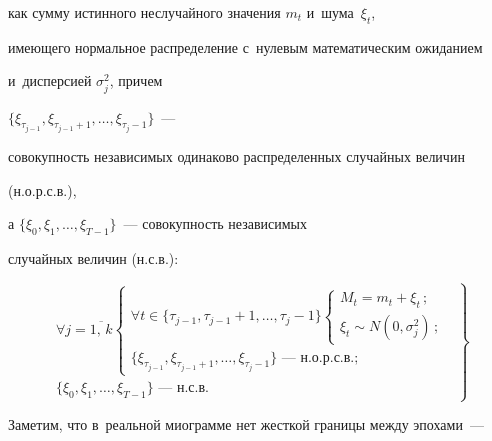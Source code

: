 как сумму истинного неслучайного значения $m_t$ и~шума~$\xi_t$,


имеющего нормальное распределение с~нулевым математическим ожиданием


и~дисперсией $\sigma^2_j$, причем


$\{\xi_{\tau_{j-1}} ,  \xi_{\tau_{j-1}+1} , \ldots,  \xi_{\tau_{j}-1}\}$~---


совокупность независимых одинаково распределенных случайных величин


(н.о.р.с.в.),


а $\{\xi_0 ,  \xi_1 , \ldots ,  \xi_{T-1}\}$~--- совокупность независимых


случайных величин (н.с.в.):


\begin{equation}


\left.


\begin{array}{l}


    \forall j=\overline{1,\, k}


    \begin{cases}


        \forall t \in \{\tau_{j-1} , \tau_{j-1} + 1 , \ldots , \tau_{j} - 1\}


        \begin{cases}


            M_t = m_t + \xi_t \,;  \\


            \xi_t \sim N\left(0,\sigma^2_j\right) \,;


        \end{cases}\\


        \{\xi_{\tau_{j-1}} ,  \xi_{\tau_{j-1}+1} , \ldots ,


         \xi_{\tau_{j}-1}\} \mbox{ --- н.о.р.с.в.};


    \end{cases}\\


    \{\xi_0 ,  \xi_1 , \ldots ,  \xi_{T-1}\} \mbox{ --- н.с.в.}


\end{array}


\right\}


     \label{miogramma}


\end{equation}


Заметим, что в~реальной миограмме нет жесткой границы между эпохами~---


